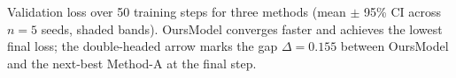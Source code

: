 \caption{Validation loss over 50 training steps for three methods (mean $\pm$ 95\% CI across $n{=}5$ seeds, shaded bands). OursModel converges faster and achieves the lowest final loss; the double-headed arrow marks the gap $\Delta{=}0.155$ between OursModel and the next-best Method-A at the final step.}
